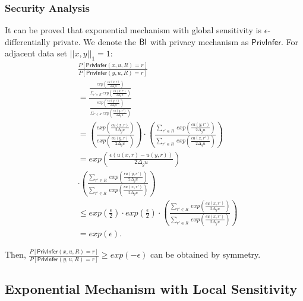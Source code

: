 \documentclass{article}
\begin{document}

\subsubsection{Security Analysis}
It can be proved that exponential mechanism with global sensitivity is $\epsilon$-differentially private. We denote the $\mathsf{BI}$ with privacy mechanism as $\mathsf{PrivInfer}$. For adjacent data set $||x,y||_1 = 1$:
\begin{equation*}
\begin{split}
& \frac{P[\mathsf{PrivInfer}(x,u,R) = r]}{P[\mathsf{PrivInfer}(y,u,R) = r]} \\
& =\frac
{\frac
{exp(\frac{\epsilon u(x,r)}{2 \Delta_{g}u})}
{\Sigma_{r' \in R}\ exp(\frac{\epsilon u(x,r')}{2 \Delta_{g}u})}}
{\frac
{exp(\frac{\epsilon u(y,r)}{2 \Delta_{g}u})}
{\Sigma_{r' \in R}\ exp(\frac{\epsilon u(y,r')}{2 \Delta_{g}u})}} \\
& = \left(\frac
{exp(\frac{\epsilon u(x,r)}{2 \Delta_{g}u})}
{exp(\frac{\epsilon u(y,r)}{2 \Delta_{g}u})}
\right)
\cdot
\left(\frac
{\sum\limits_{r' \in R}\ exp(\frac{\epsilon u(y,r')}{2 \Delta_{g}u})}
{\sum\limits_{r' \in R}\ exp(\frac{\epsilon u(x,r')}{2 \Delta_{g}u})}
\right)\\
& = exp\left(\frac
{\epsilon (u(x,r) - u(y,r))}
{2 \Delta_{g}u}
\right) \\
& \cdot
\left(\frac
{\sum\limits_{r' \in R}\ exp(\frac{\epsilon u(y,r')}{2 \Delta_{g}u})}
{\sum\limits_{r' \in R}\ exp(\frac{\epsilon u(x,r')}{2 \Delta_{g}u})}
\right)\\
& \leq
exp(\frac{\epsilon}{2}) \cdot exp(\frac{\epsilon}{2}) \cdot
\left(\frac
{\sum\limits_{r' \in R}\ exp(\frac{\epsilon u(x,r')}{2 \Delta_{g}u})}
{\sum\limits_{r' \in R}\ exp(\frac{\epsilon u(x,r')}{2 \Delta_{g}u})}
\right)\\
& = exp(\epsilon).
\end{split}
\end{equation*}

Then, $\frac{P[\mathsf{PrivInfer}(x,u,R) = r]}{P[\mathsf{PrivInfer}(y,u,R) = r]} \geq exp(-\epsilon)$ can be obtained by symmetry.


\subsection{Exponential Mechanism with Local Sensitivity}
\label{subsec_emls}
\end{document}
